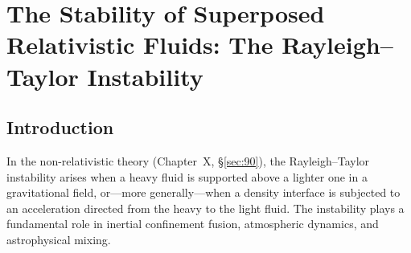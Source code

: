 
\chapter{The Stability of Superposed Relativistic Fluids: The Rayleigh--Taylor Instability}
\label{ch:rel-10}

\section{Introduction}\label{sec:rel-90}

In the non-relativistic theory (Chapter~X, \S\ref{sec:90}), the
Rayleigh--Taylor instability arises when a heavy fluid is supported above a
lighter one in a gravitational field, or---more generally---when a density
interface is subjected to an acceleration directed from the heavy to the
light fluid.  The instability plays a fundamental role in inertial
confinement fusion, atmospheric dynamics, and astrophysical mixing.

